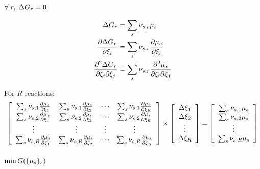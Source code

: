 \subsubsection{\texorpdfstring{$\forall\;r,\;\DGibbs_r = 0$}{Reaction enthalpy}}

\begin{equation}
\begin{split}
\DGibbs_r & = \sum_s \scoef[s,r] \chempot[s]\\
\doverdext[i]{\DGibbs_r}   & = \sum_s\scoef[s,r]\doverdext[i]{\chempot[s]} \\
\ddoverddext{\DGibbs_r}{i}{j} & = \sum_s\scoef[s,r]\ddoverddext{\chempot[s]}{i}{j} \\
\end{split}
\end{equation}

For $R$ reactions:
\begin{equation}
\left[\begin{array}{cccc}
\sum_s\scoef[s,1]\doverdext[1]{\chempot[s]} & \sum_s\scoef[s,1]\doverdext[2]{\chempot[s]} & \cdots & \sum_s\scoef[s,1]\doverdext[R]{\chempot[s]}\\
\sum_s\scoef[s,2]\doverdext[1]{\chempot[s]} & \sum_s\scoef[s,2]\doverdext[2]{\chempot[s]} & \cdots & \sum_s\scoef[s,2]\doverdext[R]{\chempot[s]}\\
\vdots &\vdots &\vdots &\vdots \\
\sum_s\scoef[s,R]\doverdext[1]{\chempot[s]} & \sum_s\scoef[s,R]\doverdext[2]{\chempot[s]} & \cdots & \sum_s\scoef[s,R]\doverdext[R]{\chempot[s]}\\
\end{array}\right]
\times
\left[\begin{array}{c}
\Delta\ext[1] \\
\Delta\ext[2] \\
\vdots \\ 
\Delta\ext[R]
\end{array}\right]
=
\left[\begin{array}{c}
\sum_s \scoef[s,1] \chempot[s] \\ 
\sum_s \scoef[s,2] \chempot[s] \\ 
\vdots \\ 
\sum_s \scoef[s,R] \chempot[s]
\end{array}\right]
\end{equation}

\subsubsection{\texorpdfstring{$\min\Gibbs(\{\chempot[s]\}_s)$}{Phase enthalpy minimization}}

